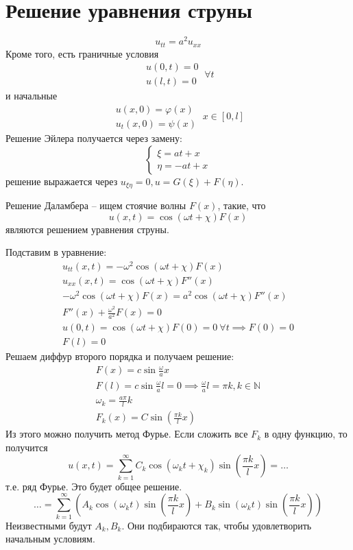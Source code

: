 \section{Решение уравнения струны}
\[
	u_{tt} = a^2 u_{xx}
\]
Кроме того, есть граничные условия
\[
	\begin{aligned}
		u(0,t)=0 \\
		u(l,t)=0 
	\end{aligned} ~ \forall t
\]
и начальные
\[
	\begin{aligned}
		u(x,0) = \varphi(x) \\
		u_t(x,0) = \psi(x)
	\end{aligned} ~ x \in [0,l]
\]
Решение Эйлера получается через замену:
\[
	\left\{
	\begin{aligned}
		\xi = at + x \\
		\eta = -at + x
	\end{aligned}
	\right.
\]
решение выражается через $u_{\xi \eta}=0, u=G(\xi) + F(\eta)$.

Решение Даламбера -- ищем стоячие волны $F(x)$, такие, что 
\[
	u(x,t) = \cos \left(\omega t + \chi\right) F(x)
\] являются решением уравнения струны.

Подставим в уравнение:
\[
	\begin{aligned}
	u_{tt}(x,t) = - \omega^2 \cos (\omega t + \chi) F(x)  \\
	u_{xx}(x,t) = \cos (\omega t + \chi) F''(x) \\
	-\omega^2 \cos(\omega t + \chi) F(x) = a^2 \cos(\omega t + \chi) F''(x) \\
	F''(x) + \frac{\omega^2}{a^2} F(x) = 0 \\
	u(0,t) = \cos(\omega t + \chi) F(0) = 0 ~ \forall t \implies F(0) = 0 \\
	F(l) = 0
\end{aligned}
\]
Решаем диффур второго порядка и получаем решение:
\[
	\begin{aligned}
	F(x) = c \sin \frac{\omega}{a} x \\
	F(l) = c \sin \frac{\omega}{a} l = 0 \implies \frac{\omega}{a}l = \pi k, k \in \mathbb{N} \\
	\omega_k = \frac{a \pi}{l} k \\
	F_k (x) = C \sin \left(\frac{\pi k}{l} x\right)
\end{aligned}
\]
Из этого можно получить метод Фурье. Если сложить все $F_k$ в одну функцию, то получится
\[
	u(x,t) = \sum_{k=1}^\infty C_k \cos(\omega_k t+\chi_k)\sin \left( \frac{\pi k}{l} x\right) = \dots
\]
т.е. ряд Фурье. Это будет общее решение.
\[
	\dots = \sum_{k=1}^\infty \left( A_k \cos (\omega_k t) \sin \left( \frac{\pi k}{l} x\right) + B_k \sin (\omega_k t) \sin \left( \frac{\pi k}{l} x\right)\right)
\]
Неизвестными будут $A_k, B_k$. Они подбираются так, чтобы удовлетворить начальным условиям.

